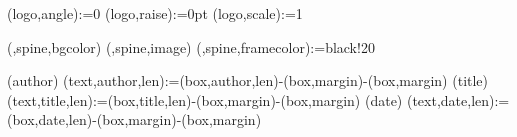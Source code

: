 (logo,angle):={0}
(logo,raise):={0pt}
(logo,scale):={1}

(,spine,bgcolor){}{%
  (,spine,image){}{%
    (,spine,framecolor):={black!20}%
  }%
}%


(author){%
  \spine(text,author,len):={\dimexpr\thespine(box,author,len)-\thespine(box,margin)-\thespine(box,margin)}
}{}
(title){%
  \spine(text,title,len):={\dimexpr\thespine(box,title,len)-\thespine(box,margin)-\thespine(box,margin)}
}{}
(date){%
  \spine(text,date,len):={\dimexpr\thespine(box,date,len)-\thespine(box,margin)-\thespine(box,margin)}
}{}


\newcommand{\@spinetextalin}[1]{%
  \raggedright%
  \IfStrEqCase{\thespine(box,#1,align)}{%
    {l}{\raggedright}%
    {c}{\centering}%
    {r}{\raggedleft}%
  }%
}

\newcommand{\@spinetextcolor}[1]{%
  \ifdatadefined{spine}(box,#1,textcolor){%
    \color{\thespine(box,#1,textcolor)}%
  }{\ifdatadefined{spine}(text,color){%
    \color{\thespine(text,color)}%
  }{}%
  }%
}

